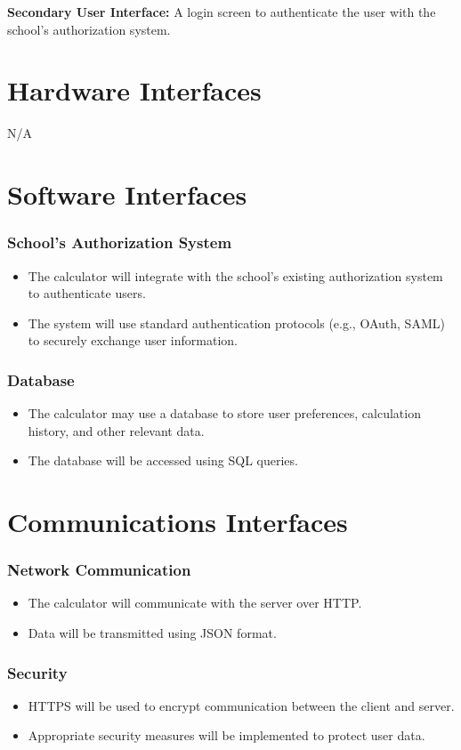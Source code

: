 \documentclass{scrreprt}
\begin{document}
{\bf Secondary User Interface:} A login screen to authenticate the user with the school's authorization system.

\section{Hardware Interfaces}
N/A

\section{Software Interfaces}
\subsubsection*{School's Authorization System}
\begin{itemize}
    \item The calculator will integrate with the school's existing authorization system to authenticate users.
    \item The system will use standard authentication protocols (e.g., OAuth, SAML) to securely exchange user information.
\end{itemize}
\subsubsection*{Database}
\begin{itemize}
    \item The calculator may use a database to store user preferences, calculation history, and other relevant data.
    \item The database will be accessed using SQL queries.
\end{itemize}


\section{Communications Interfaces}
\subsubsection*{Network Communication}
\begin{itemize}
    \item The calculator will communicate with the server over HTTP.
    \item Data will be transmitted using JSON format.
\end{itemize}

\subsubsection{Security}
\begin{itemize}
    \item HTTPS will be used to encrypt communication between the client and server.
    \item Appropriate security measures will be implemented to protect user data.
\end{itemize}
\end{document}
